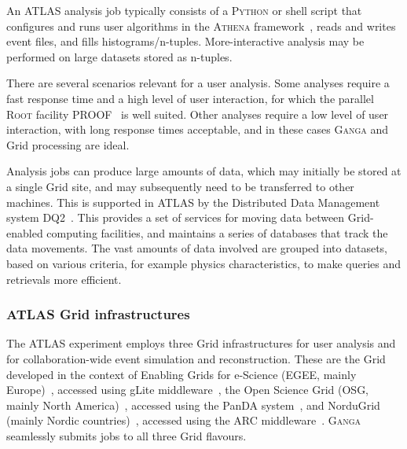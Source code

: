 \documentclass{elsart}
\def\atlas {ATLAS\xspace}
\def\ganga {\textsc{Ganga}\xspace}
\def\python {\textsc{Python}\xspace}
\def\root {\textsc{Root}\xspace}
\def\athena {\textsc{Athena}\xspace}
\def\grid {Grid\xspace}
\begin{document}
An \atlas analysis job typically consists of a \python
or shell script that configures and runs user algorithms in the \athena
framework~\cite{bib:atlascompmod}, reads and writes event files, and
fills histograms/n-tuples. More-interactive analysis may be performed on
large datasets stored as n-tuples.

There are several scenarios relevant for a user analysis.  Some analyses require
a fast response time and a high level of user interaction, for which the
parallel \root facility PROOF~\cite{ballintijn_2006} is well suited.  Other
analyses require a low level of user interaction, with long response times
acceptable, and in these cases \ganga and \grid processing are ideal.

Analysis jobs can produce large amounts of data, which may initially be
stored at a single \grid site, and may subsequently need to be transferred
to other machines.  This is supported in \atlas by the Distributed Data
Management system DQ2~\cite{bib:atlasdq2}.  This provides
a set of services for moving data between \grid-enabled computing facilities,
and maintains a series of databases that track the data movements.  The
vast amounts of data involved are grouped into datasets, based on various
criteria, for example physics characteristics, to make queries and retrievals
more efficient.

\subsubsection{\atlas \grid infrastructures}

The \atlas experiment employs three \grid infrastructures for user
analysis and for collaboration-wide event simulation and reconstruction. These
are the \grid developed in the context of Enabling  Grids for e-Science
(EGEE, mainly Europe)~\cite{jones_2005}, accessed using gLite
middleware~\cite{andreetto_2008}, the Open Science Grid (OSG, mainly North
America)~\cite{OSG}, accessed using the PanDA system~\cite{maeno_2008}, and
NorduGrid (mainly Nordic countries)~\cite{ellert_2003}, accessed using the
ARC middleware~\cite{ellert_2007}.  \ganga seamlessly submits jobs to all
three \grid flavours.
\end{document}
